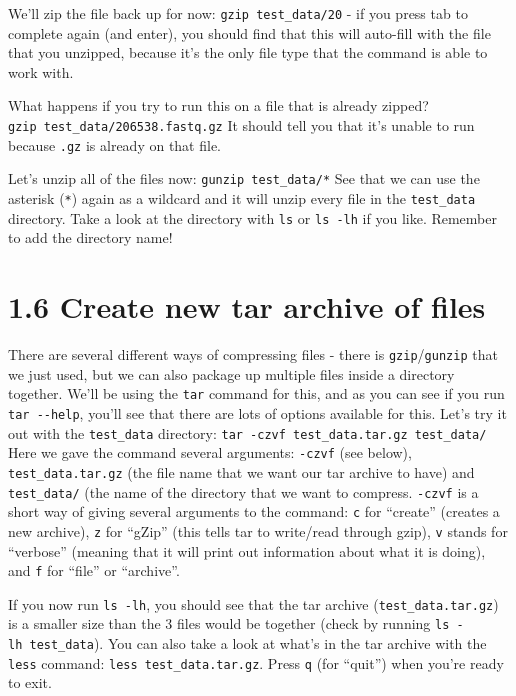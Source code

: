 \documentclass[
]{book}
\begin{document}
We'll zip the file back up for now: \texttt{gzip\ test\_data/20} - if you press tab to complete again (and enter), you should find that this will auto-fill with the file that you unzipped, because it's the only file type that the command is able to work with.

What happens if you try to run this on a file that is already zipped? \texttt{gzip\ test\_data/206538.fastq.gz} It should tell you that it's unable to run because \texttt{.gz} is already on that file.

Let's unzip all of the files now: \texttt{gunzip\ test\_data/*}
See that we can use the asterisk (\texttt{*}) again as a wildcard and it will unzip every file in the \texttt{test\_data} directory. Take a look at the directory with \texttt{ls} or \texttt{ls\ -lh} if you like. Remember to add the directory name!

\section{1.6 Create new tar archive of files}\label{create-new-tar-archive-of-files}

There are several different ways of compressing files - there is \texttt{gzip}/\texttt{gunzip} that we just used, but we can also package up multiple files inside a directory together. We'll be using the \texttt{tar} command for this, and as you can see if you run \texttt{tar\ -\/-help}, you'll see that there are lots of options available for this. Let's try it out with the \texttt{test\_data} directory:
\texttt{tar\ -czvf\ test\_data.tar.gz\ test\_data/}
Here we gave the command several arguments: \texttt{-czvf} (see below), \texttt{test\_data.tar.gz} (the file name that we want our tar archive to have) and \texttt{test\_data/} (the name of the directory that we want to compress.
\texttt{-czvf} is a short way of giving several arguments to the command: \texttt{c} for ``create'' (creates a new archive), \texttt{z} for ``gZip'' (this tells tar to write/read through gzip), \texttt{v} stands for ``verbose'' (meaning that it will print out information about what it is doing), and \texttt{f} for ``file'' or ``archive''.

If you now run \texttt{ls\ -lh}, you should see that the tar archive (\texttt{test\_data.tar.gz}) is a smaller size than the 3 files would be together (check by running \texttt{ls\ -lh\ test\_data}). You can also take a look at what's in the tar archive with the \texttt{less} command: \texttt{less\ test\_data.tar.gz}. Press \texttt{q} (for ``quit'') when you're ready to exit.
\end{document}
